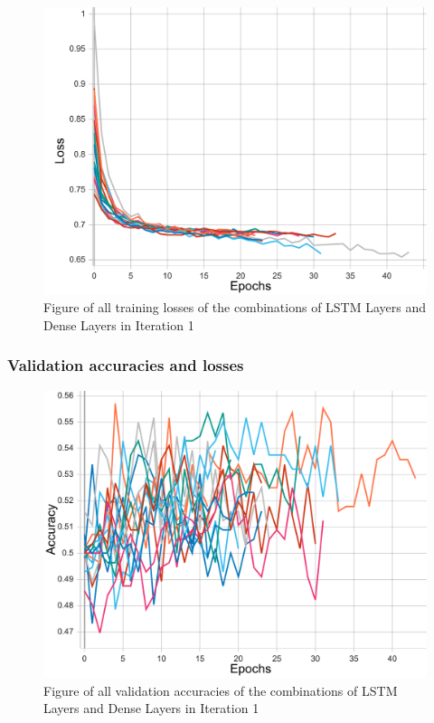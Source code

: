 \begin{figure}[ht]
    \centering
    \includegraphics[width=0.95\columnwidth]{figures/results/lstm/lstm_all_loss_t.pdf}
    \caption[Training losses for Iteration 1]{Figure of all training losses of the combinations of LSTM Layers and Dense Layers in Iteration 1}
    \label{fig:iteration1_train_loss}
\end{figure}
\FloatBarrier

\subsubsection{Validation accuracies and losses}
\begin{figure}[ht]
    \centering
    \includegraphics[width=0.95\columnwidth]{figures/results/lstm/lstm_all_acc.pdf}
    \caption[Validation accuracies for Iteration 1]{Figure of all validation accuracies of the combinations of LSTM Layers and Dense Layers in Iteration 1}
    \label{fig:iteration1_all_accuracy}
\end{figure}
\FloatBarrier

